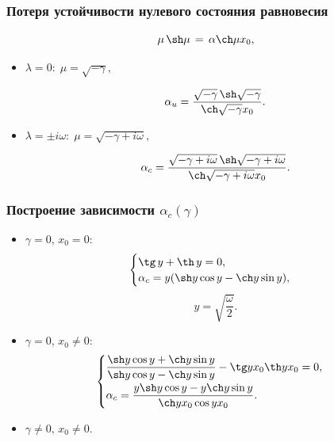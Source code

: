 \documentclass[fullscreen=true, unicode, bookmarks=false]{beamer}
\begin{document}
\begin{frame}
\frametitle{ Потеря устойчивости нулевого состояния равновесия }
 
\begin{equation}
	\mu \, \sh \mu \, = \, \alpha \ch \mu x_0,
\end{equation}

\medskip

\begin{itemize}

\item { $ \lambda = 0: \; \mu = \sqrt{-\gamma}, $ 
}

$$ \alpha_u = \frac{ \sqrt{-\gamma} \, \sh \sqrt{-\gamma} }{ \ch \sqrt{-\gamma} x_0 }. $$

\item { $ \lambda = \pm i \omega: \; \mu = \sqrt{-\gamma + i \omega}, $ 
}

$$ \alpha_c = \frac{ \sqrt{-\gamma + i \omega} \, \sh \sqrt{-\gamma + i \omega} }{ \ch \sqrt{-\gamma + i \omega} x_0 }. $$

\end{itemize}	

\end{frame}

\begin{frame}
\frametitle{ Построение зависимости $ \alpha_c(\gamma) $ }
 
\begin{itemize}

\item { $ \gamma = 0, \, x_0 = 0: $ 
\begin{equation}
 \begin{cases}
   \tg \, y + \th \, y = 0, 
   \\
   \alpha_c = y(\sh y \cos y - \ch y \sin y),
 \end{cases}
\end{equation}
$$ y = \sqrt{ \frac{\omega}{2} }. $$
}

\item { $ \gamma = 0, \, x_0 \neq 0: $ 
\begin{equation}
 \begin{cases}
   \dfrac{\sh y \cos y + \ch y \sin y}{\sh y \cos y - \ch y \sin y} - \tg y x_0 \th y x_0 = 0, 
   \vspace{0.1cm}
   \\ 
   \alpha_c = \dfrac{y \sh y \cos y - y \ch y \sin y}{\ch y x_0 \cos y x_0}.
 \end{cases}
\end{equation}
}

\item { $ \gamma \neq 0, \, x_0 \neq 0. $ 
}

\end{itemize}	

\end{frame}
\end{document}
